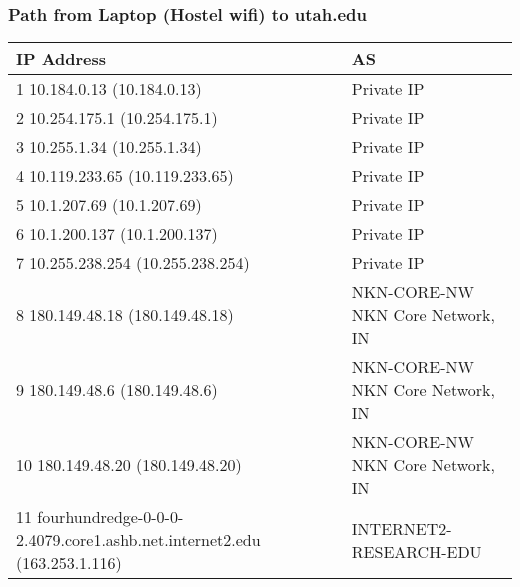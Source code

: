 \subsubsection*{Path from Laptop (Hostel wifi) to utah.edu}
\begin{table}[!ht]
    \centering
\footnotesize
\begin{tabular}{|l|l|}
\hline
\textbf{IP Address}                                                         & \textbf{AS}                                                                     \\ \hline
1  10.184.0.13 (10.184.0.13)                                                & Private IP                                                                      \\ \hline
2  10.254.175.1 (10.254.175.1)                                               & Private IP                                                                      \\ \hline
3  10.255.1.34 (10.255.1.34)                                                & Private IP                                                                      \\ \hline
4  10.119.233.65 (10.119.233.65)                                            & Private IP                                                                      \\ \hline
5  10.1.207.69 (10.1.207.69)                                                & Private IP                                                                      \\ \hline
6  10.1.200.137 (10.1.200.137)                                              & Private IP                                                                      \\ \hline
7  10.255.238.254 (10.255.238.254)                                          & Private IP                                                                      \\ \hline
8  180.149.48.18 (180.149.48.18)                                            & NKN-CORE-NW NKN Core Network, IN \\ \hline
9  180.149.48.6 (180.149.48.6)                                              & NKN-CORE-NW NKN Core Network, IN \\ \hline
10  180.149.48.20 (180.149.48.20)                                           & NKN-CORE-NW NKN Core Network, IN \\ \hline
11  fourhundredge-0-0-0-2.4079.core1.ashb.net.internet2.edu (163.253.1.116) & INTERNET2-RESEARCH-EDU           \\ \hline

\end{tabular}
\end{table}
